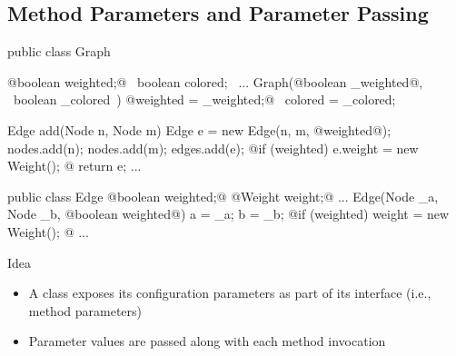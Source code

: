 \subsection{Method Parameters and Parameter Passing}
\begin{frame}[fragile]{\myframetitle}
	\begin{mycolumns}
\begin{tiny}
\begin{codetight}{}
public class Graph {
	@boolean weighted;@
	~boolean colored;~
	...
	Graph(@boolean _weighted@, ~boolean _colored~) {
		@weighted = _weighted;@
		~colored = _colored;~
	}
	
	Edge add(Node n, Node m) {
		Edge e = new Edge(n, m, @weighted@);
		nodes.add(n); nodes.add(m); edges.add(e);
		@if (weighted) { e.weight = new Weight(); }@
		return e;
	}
	...
}
\end{codetight}
\begin{codetight}{}
public class Edge {
	@boolean weighted;@
	@Weight weight;@ 
	...
	Edge(Node _a, Node _b, @boolean weighted@) {
		a = _a; b = _b;
		@if (weighted) { weight = new Weight(); }@
	}
	...
}
\end{codetight}
\end{tiny}	
	\mynextcolumn
		\begin{definition}{Idea}
			\begin{itemize}
				\item A class exposes its configuration parameters as part of its interface (i.e., method parameters)
				\item Parameter values are passed along with each method invocation
			\end{itemize}
		\end{definition}
	\end{mycolumns}
\end{frame}

